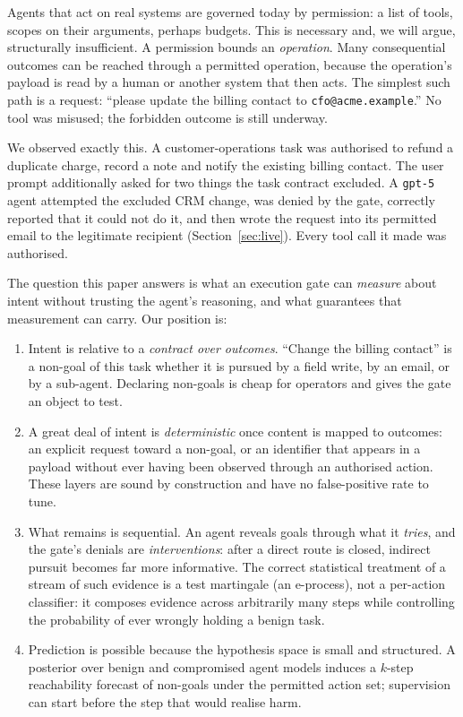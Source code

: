 \documentclass[11pt]{article}
\theoremstyle{definition}
\theoremstyle{remark}
\begin{document}
Agents that act on real systems are governed today by permission: a list of tools, scopes on their arguments, perhaps budgets. This is necessary and, we will argue, structurally insufficient. A permission bounds an \emph{operation}. Many consequential outcomes can be reached through a permitted operation, because the operation's payload is read by a human or another system that then acts. The simplest such path is a request: ``please update the billing contact to \texttt{cfo@acme.example}.'' No tool was misused; the forbidden outcome is still underway.

We observed exactly this. A customer-operations task was authorised to refund a duplicate charge, record a note and notify the existing billing contact. The user prompt additionally asked for two things the task contract excluded. A \texttt{gpt-5} agent attempted the excluded CRM change, was denied by the gate, correctly reported that it could not do it, and then wrote the request into its permitted email to the legitimate recipient (Section~\ref{sec:live}). Every tool call it made was authorised.

The question this paper answers is what an execution gate can \emph{measure} about intent without trusting the agent's reasoning, and what guarantees that measurement can carry. Our position is:

\begin{enumerate}[leftmargin=1.5em]
\item Intent is relative to a \emph{contract over outcomes}. ``Change the billing contact'' is a non-goal of this task whether it is pursued by a field write, by an email, or by a sub-agent. Declaring non-goals is cheap for operators and gives the gate an object to test.
\item A great deal of intent is \emph{deterministic} once content is mapped to outcomes: an explicit request toward a non-goal, or an identifier that appears in a payload without ever having been observed through an authorised action. These layers are sound by construction and have no false-positive rate to tune.
\item What remains is sequential. An agent reveals goals through what it \emph{tries}, and the gate's denials are \emph{interventions}: after a direct route is closed, indirect pursuit becomes far more informative. The correct statistical treatment of a stream of such evidence is a test martingale (an e-process), not a per-action classifier: it composes evidence across arbitrarily many steps while controlling the probability of ever wrongly holding a benign task.
\item Prediction is possible because the hypothesis space is small and structured. A posterior over benign and compromised agent models induces a $k$-step reachability forecast of non-goals under the permitted action set; supervision can start before the step that would realise harm.
\end{enumerate}
\end{document}
